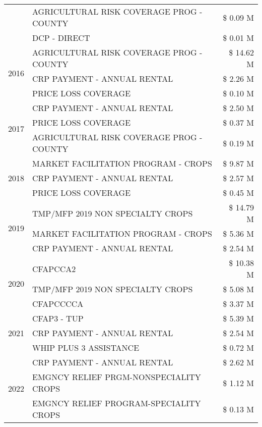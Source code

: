 \begin{tabular}{llr}
 & AGRICULTURAL RISK COVERAGE PROG - COUNTY & \$ 0.09 M \\
 & DCP - DIRECT & \$ 0.01 M \\
\cline{1-3}
\multirow[t]{3}{*}{2016} & AGRICULTURAL RISK COVERAGE PROG - COUNTY & \$ 14.62 M \\
 & CRP PAYMENT - ANNUAL RENTAL & \$ 2.26 M \\
 & PRICE LOSS COVERAGE & \$ 0.10 M \\
\cline{1-3}
\multirow[t]{3}{*}{2017} & CRP PAYMENT - ANNUAL RENTAL & \$ 2.50 M \\
 & PRICE LOSS COVERAGE & \$ 0.37 M \\
 & AGRICULTURAL RISK COVERAGE PROG - COUNTY & \$ 0.19 M \\
\cline{1-3}
\multirow[t]{3}{*}{2018} & MARKET FACILITATION PROGRAM - CROPS & \$ 9.87 M \\
 & CRP PAYMENT - ANNUAL RENTAL & \$ 2.57 M \\
 & PRICE LOSS COVERAGE & \$ 0.45 M \\
\cline{1-3}
\multirow[t]{3}{*}{2019} & TMP/MFP 2019 NON SPECIALTY CROPS & \$ 14.79 M \\
 & MARKET FACILITATION PROGRAM - CROPS & \$ 5.36 M \\
 & CRP PAYMENT - ANNUAL RENTAL & \$ 2.54 M \\
\cline{1-3}
\multirow[t]{3}{*}{2020} & CFAPCCA2 & \$ 10.38 M \\
 & TMP/MFP 2019 NON SPECIALTY CROPS & \$ 5.08 M \\
 & CFAPCCCCA & \$ 3.37 M \\
\cline{1-3}
\multirow[t]{3}{*}{2021} & CFAP3 - TUP & \$ 5.39 M \\
 & CRP PAYMENT - ANNUAL RENTAL & \$ 2.54 M \\
 & WHIP PLUS 3 ASSISTANCE & \$ 0.72 M \\
\cline{1-3}
\multirow[t]{3}{*}{2022} & CRP PAYMENT - ANNUAL RENTAL & \$ 2.62 M \\
 & EMGNCY RELIEF PRGM-NONSPECIALITY CROPS & \$ 1.12 M \\
 & EMGNCY RELIEF PROGRAM-SPECIALITY CROPS & \$ 0.13 M \\
\cline{1-3}
\bottomrule
\end{tabular}
